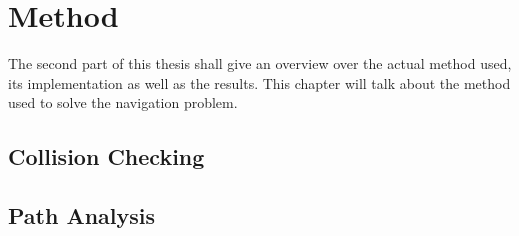 \chapter{Method}
The second part of this thesis shall give an overview over the actual method used, its implementation as well as the results. This chapter will talk about the method used to solve the navigation problem.



\section{Collision Checking}



\section{Path Analysis}